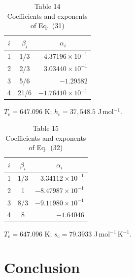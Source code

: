 \documentclass[11pt]{article}
\newcommand{\Jmol}{J\,mol$^{-1}$}
\newcommand{\JmolK}{J\,mol$^{-1}$\,K$^{-1}$}
\begin{document}
\begin{table}[htbp]
\centering
\caption*{Table 14\\ Coefficients and exponents of Eq.~(31)}
\begin{tabular}{ccr}
\toprule
$i$ & $\beta_i$ & \multicolumn{1}{c}{$\alpha_i$} \\
\midrule
1 & 1/3  & $-4.37196\times10^{-1}$ \\
2 & 2/3  & $3.03440\times10^{-1}$ \\
3 & 5/6  & $-1.29582$ \\
4 & 21/6 & $-1.76410\times10^{-1}$ \\
\bottomrule
\end{tabular}

\vspace{2pt}
\footnotesize $T_\mathrm{c} = 647.096$ K;
$h_\mathrm{c} = 37{,}548.5$ \Jmol.
\end{table}

\begin{table}[htbp]
\centering
\caption*{Table 15\\ Coefficients and exponents of Eq.~(32)}
\begin{tabular}{ccr}
\toprule
$i$ & $\beta_i$ & \multicolumn{1}{c}{$\alpha_i$} \\
\midrule
1 & 1/3 & $-3.34112\times10^{-1}$ \\
2 & 1   & $-8.47987\times10^{-1}$ \\
3 & 8/3 & $-9.11980\times10^{-1}$ \\
4 & 8   & $-1.64046$ \\
\bottomrule
\end{tabular}

\vspace{2pt}
\footnotesize $T_\mathrm{c} = 647.096$ K;
$s_\mathrm{c} = 79.3933$ \JmolK.
\end{table}

\section{Conclusion}
\end{document}
